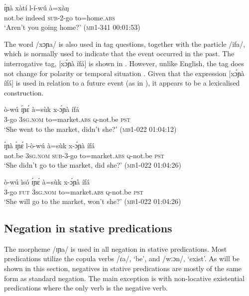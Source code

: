 \documentclass[output=paper,colorlinks,citecolor=brown,draftmode]{langscibook}
\begin{document}
\ea\label{ex:lop:24}
        \gll ɪ́ɲà xàtí l-í-wú à=xàŋ \\ 
             not.be indeed \textsc{sub}{}-2-go to=home.\textsc{abs} \\
        \glt ‘Aren’t you going home?’ (\textsc{mb1-341} 00:01:53)
\z

The word /xɔɲa/ is also used in tag questions, together with the particle /ifa/, which is normally used to indicate that the event occurred in the past. The interrogative tag, [xɔ́ɲà ífá] is shown in . However, unlike English, the tag does not change for polarity  or temporal situation . Given that the expression [xɔ́ɲà ífá] is used in relation to a future event (as in ), it appears to be a lexicalised construction.

\ea\label{ex:lop:25}
        \gll ò-wú ɪ́ɲɛ́ à=sùk x-ɔ́ɲà  ífá \\ 
             3-go 3\textsc{sg.nom} to=market.\textsc{abs} \textsc{q}{}-not.be \textsc{pst} \\
        \glt ‘She went to the market, didn’t she?’      (\textsc{mb1-022} 01:04:12)
\z

\ea\label{ex:lop:26}
        \gll ɪ́ɲà ɪ́ɲɛ́ l-ò-wú à=sùk x-ɔ́ɲà  ífá \\ 
             not.be 3\textsc{sg.nom} \textsc{sub}{}-3-go to=market.\textsc{abs} \textsc{q}{}-not.be \textsc{pst} \\
        \glt ‘She didn’t go to the market, did she?' (\textsc{mb1-022} 01:04:26)
\z

\ea\label{ex:lop:27}
        \gll ò-wú ìsó ɪ́ɲɛ́ à=sùk x-ɔ́ɲà  ífá \\ 
             3-go \textsc{fut} 3\textsc{sg.nom} to=market.\textsc{abs} \textsc{q}{}-not.be \textsc{pst} \\
        \glt ‘She will go to the market, won’t she?' (\textsc{mb1-022} 01:04:26)
\z

\subsection{Negation in stative predications}
\label{sec:lop:2.3}
The morpheme /ɪɲa/ is used in all negation in stative predications. Most predications utilize the copula verbs /ɾa/, ‘be’, and /wːɔn/, ‘exist’. As will be shown in this section, negatives in stative predications are mostly of the same form as standard negation. The main exception is with non-locative existential predications where the only verb is the negative verb.
\end{document}
